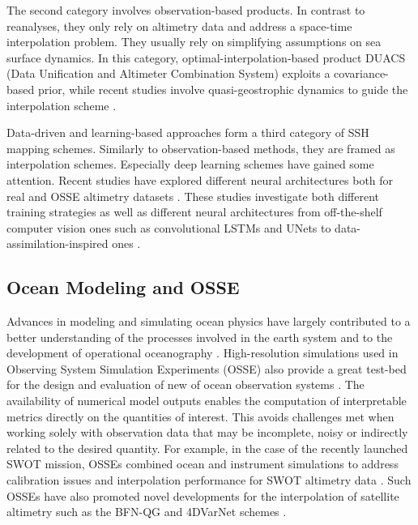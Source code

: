 \begin{bibunit}
The second category involves observation-based products. In contrast to reanalyses, they only rely on altimetry data and address a space-time interpolation problem. They usually rely on simplifying assumptions on sea surface dynamics. In this category, optimal-interpolation-based product DUACS (Data Unification and Altimeter Combination System) \cite{taburetDUACSDT2018252019} exploits a covariance-based prior, while recent studies involve quasi-geostrophic dynamics to guide the interpolation scheme \cite{guillouMappingAltimetryForthcoming2021,ballarottaDynamicMappingAlongTrack2020}.

Data-driven and learning-based approaches form a third category of SSH mapping schemes. 
Similarly to observation-based methods, they are framed as interpolation schemes.
Especially deep learning schemes have gained some attention. Recent studies have explored different neural architectures both for real and OSSE altimetry datasets \cite{archambaultMultimodalUnsupervisedSpatioTemporal2023,beauchampDatadrivenLearningbasedInterpolations2021,martinSynthesizingSeaSurface2023}. These studies investigate both different training strategies as well as different neural architectures from off-the-shelf computer vision ones such as convolutional LSTMs and UNets \cite{ronnebergerUNetConvolutionalNetworks2015} to data-assimilation-inspired ones \cite{beauchampDatadrivenLearningbasedInterpolations2021, fabletLearningVariationalData2021}.



\subsection{Ocean Modeling and OSSE}
\label{c4ssec:oceanmodeling}
Advances in modeling and simulating ocean physics have largely contributed to a better understanding of the processes involved in the earth system and to the development of operational oceanography \cite{bernardImpactPartialSteps2006,ajayiSpatialTemporalVariability2020}. 
High-resolution simulations used in Observing System Simulation Experiments (OSSE) also provide a great test-bed for the design and evaluation of new of ocean observation systems \cite{benkiranAssessingImpactAssimilation2021}.
The availability of numerical model outputs enables the computation of interpretable metrics directly on the quantities of interest. This avoids challenges met when working solely with observation data that may be incomplete, noisy or indirectly related to the desired quantity.
For example, in the case of the recently launched SWOT mission, OSSEs combined ocean and instrument simulations to address calibration issues and interpolation performance for SWOT altimetry data  \cite{dibarboureDataDrivenCalibrationAlgorithm2022}.
Such OSSEs have also promoted novel developments for the interpolation of satellite altimetry such as the BFN-QG and 4DVarNet schemes \cite{guillouMappingAltimetryForthcoming2021,beauchamp4DVarNetSSHEndtoendLearning2023}. 


\end{bibunit}
